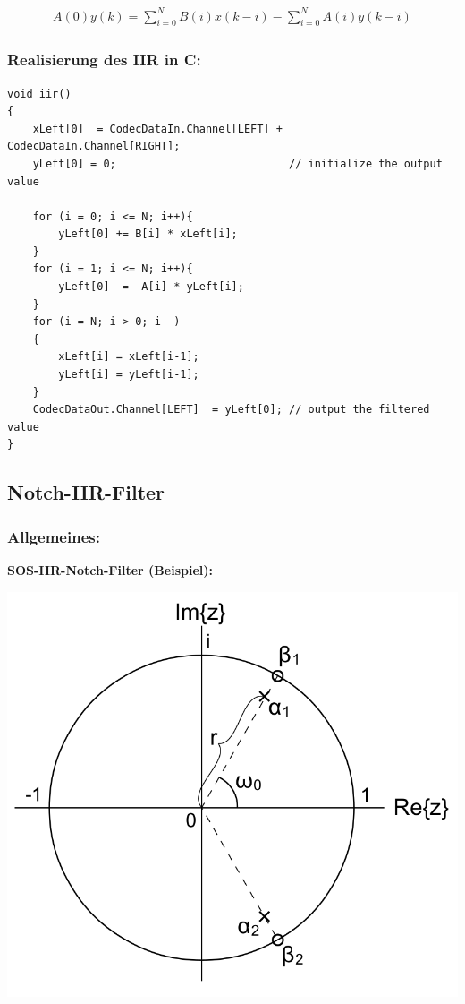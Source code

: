 \documentclass[10pt,a4paper]{article}
\begin{document}
  \begin{mdframed}[style=exercise]
    \begin{align}
        A(0)y(k)=\sum_{i=0}^{N} B(i) x(k-i) - \sum_{i=0}^{N} A(i) y(k-i)
    \end{align}
  \end{mdframed}

\subsubsection{Realisierung des IIR in C:}

\begin{verbatim}
void iir()
{
    xLeft[0]  = CodecDataIn.Channel[LEFT] + CodecDataIn.Channel[RIGHT];
    yLeft[0] = 0;                           // initialize the output value

    for (i = 0; i <= N; i++){
        yLeft[0] += B[i] * xLeft[i];
    }
    for (i = 1; i <= N; i++){
        yLeft[0] -=  A[i] * yLeft[i];
    }
    for (i = N; i > 0; i--)
    {
        xLeft[i] = xLeft[i-1];
        yLeft[i] = yLeft[i-1];
    }
    CodecDataOut.Channel[LEFT]  = yLeft[0]; // output the filtered value
}
\end{verbatim}

\subsection{Notch-IIR-Filter}
\subsubsection{Allgemeines:}
\textbf{SOS-IIR-Notch-Filter (Beispiel):}
\begin{center}
  \includegraphics[width=.5\textwidth]{./img/Notch_Filter_SOS.png}
\end{center}
\end{document}
